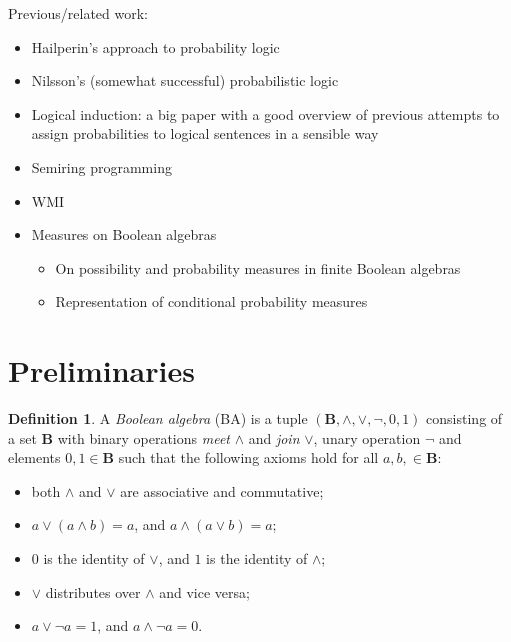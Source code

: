 \documentclass{article}
\theoremstyle{definition}
\newtheorem{definition}{Definition}
\theoremstyle{remark}
\begin{document}
Previous/related work:
\begin{itemize}
\item Hailperin's approach to probability logic
  \cite{DBLP:journals/ndjfl/Hailperin84}
\item Nilsson's (somewhat successful) probabilistic logic
  \cite{DBLP:journals/ai/Nilsson86}
\item Logical induction: a big paper with a good overview of previous attempts
  to assign probabilities to logical sentences in a sensible way
  \cite{DBLP:journals/eccc/GarrabrantBCST16}
\item Semiring programming \cite{DBLP:journals/corr/BelleR16}
\item WMI \cite{DBLP:conf/ijcai/BellePB15}
\item Measures on Boolean algebras
  \begin{itemize}
  \item On possibility and probability measures in finite Boolean algebras
    \cite{DBLP:journals/soco/CastineiraCT02}
  \item Representation of conditional probability measures
    \cite{krauss1968representation}
  \end{itemize}
\end{itemize}

\section{Preliminaries}

\begin{definition} \label{def:ba}
  A \emph{Boolean algebra} (BA) is a tuple $(\mathbf{B}, \land, \lor, \neg, 0,
  1)$ consisting of a set $\mathbf{B}$ with binary operations \emph{meet}
  $\land$ and \emph{join} $\lor$, unary operation $\neg$ and elements $0, 1 \in
  \mathbf{B}$ such that the following axioms hold for all $a, b, \in
  \mathbf{B}$:
  \begin{itemize}
  \item both $\land$ and $\lor$ are associative and commutative;
  \item $a \lor (a \land b) = a$, and $a \land (a \lor b) = a$;
  \item $0$ is the identity of $\lor$, and $1$ is the identity of $\land$;
  \item $\lor$ distributes over $\land$ and vice versa;
  \item $a \lor \neg a = 1$, and $a \land \neg a = 0$.
  \end{itemize}
\end{definition}
\end{document}
